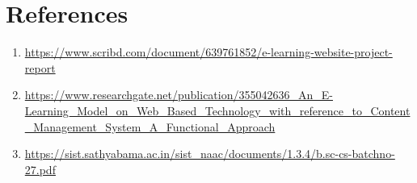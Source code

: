 \documentclass[BTech]{audiss}
\begin{document}
\section{References}
\begin{enumerate}
    \item \url{https://www.scribd.com/document/639761852/e-learning-website-project-report}
    \item \url{https://www.researchgate.net/publication/355042636_An_E-Learning_Model_on_Web_Based_Technology_with_reference_to_Content_Management_System_A_Functional_Approach}
    \item \url{https://sist.sathyabama.ac.in/sist_naac/documents/1.3.4/b.sc-cs-batchno-27.pdf}
\end{enumerate}
\end{document}
